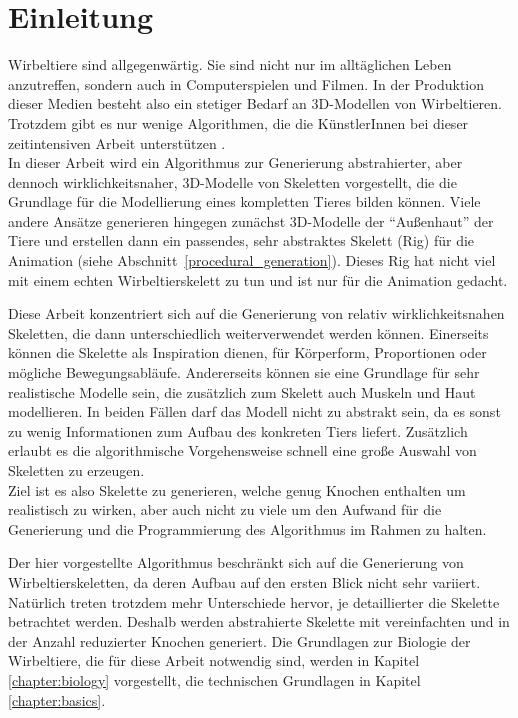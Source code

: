 \chapter{Einleitung}

Wirbeltiere sind allgegenwärtig. Sie sind nicht nur im alltäglichen Leben anzutreffen, sondern auch in Computerspielen und Filmen. In der Produktion dieser Medien besteht also ein stetiger Bedarf an 3D-Modellen von Wirbeltieren.
Trotzdem gibt es nur wenige Algorithmen, die die KünstlerInnen bei dieser zeitintensiven Arbeit unterstützen \cite{PCGSurvey_videoGames}.\\
In dieser Arbeit wird ein Algorithmus zur Generierung abstrahierter, aber dennoch wirklichkeitsnaher, 3D-Modelle von Skeletten vorgestellt, die die Grundlage für die Modellierung eines kompletten Tieres bilden können.
Viele andere Ansätze generieren hingegen zunächst 3D-Modelle der "`Außenhaut"' der Tiere und erstellen dann ein passendes, sehr abstraktes Skelett (Rig) für die Animation (siehe \mbox{Abschnitt \ref{procedural_generation}}). 
Dieses Rig hat nicht viel mit einem echten Wirbeltierskelett zu tun und ist nur für die Animation gedacht.

Diese Arbeit konzentriert sich auf die Generierung von relativ wirklichkeitsnahen Skeletten, die dann unterschiedlich weiterverwendet werden können.
Einerseits können die Skelette als Inspiration dienen, \zb für Körperform, Proportionen oder mögliche Bewegungsabläufe.
Andererseits können sie eine Grundlage für sehr realistische Modelle sein, die zusätzlich zum Skelett auch Muskeln und Haut modellieren.
In beiden Fällen darf das Modell nicht zu abstrakt sein, da es sonst zu wenig Informationen zum Aufbau des konkreten Tiers liefert. Zusätzlich erlaubt es die algorithmische Vorgehensweise schnell eine große Auswahl von Skeletten zu erzeugen.\\
Ziel ist es also Skelette zu generieren, welche genug Knochen enthalten um realistisch zu wirken, aber auch nicht zu viele um den Aufwand für die Generierung und die Programmierung des Algorithmus im Rahmen zu halten.

Der hier vorgestellte Algorithmus beschränkt sich auf die Generierung von Wirbeltierskeletten, da deren Aufbau auf den ersten Blick nicht sehr variiert. Natürlich treten trotzdem mehr Unterschiede hervor, je detaillierter die Skelette betrachtet werden.
Deshalb werden abstrahierte Skelette mit vereinfachten und in der Anzahl reduzierter Knochen generiert. Die Grundlagen zur Biologie der Wirbeltiere, die für diese Arbeit notwendig sind, werden in Kapitel \ref{chapter:biology} vorgestellt, die technischen Grundlagen in Kapitel \ref{chapter:basics}.

